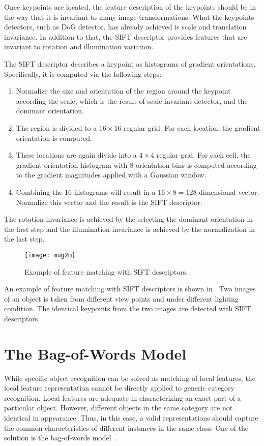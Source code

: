 \documentclass[12pt,final,twoside]{report}
\begin{document}
Once keypoints are located, the feature description of the keypoints should be in the way that it is invariant to many image transformations. What the keypoints detectors, such as DoG detector, has already achieved is scale and translation invariance. In addition to that, the SIFT descriptor provides features that are invariant to rotation and illumination variation.

The SIFT descriptor describes a keypoint as histograms of gradient orientations. Specifically, it is computed via the following steps:
\begin{enumerate}
  \item Normalize the size and orientation of the region around the keypoint according the scale, which is the result of scale invariant detector, and the dominant orientation.
  \item The region is divided to a $16 \times 16$ regular grid. For each location, the gradient orientation is computed.
  \item These locations are again divide into a $4 \times 4$ regular grid. For each cell, the gradient orientation histogram with 8 orientation bins is computed according to the gradient magnitudes applied with a Gaussian window.
  \item Combining the $16$ histograms will result in a $16 \times 8 = 128$ dimensional vector. Normalize this vector and the result is the SIFT descriptor.
\end{enumerate}

The rotation invariance is achieved by the selecting the dominant orientation in the first step and the illumination invariance is achieved by the normalization in the last step.

\begin{figure}[t]
  \centering
  \texttt{[image: mug2m]}
  \caption{Example of feature matching with SIFT descriptors.}
  \label{fig:match}
\end{figure}

An example of feature matching with SIFT descriptors is shown in . Two images of an object is taken from different view points and under different lighting condition. The identical keypoints from the two images are detected with SIFT descriptors.

\section{The Bag-of-Words Model}
While specific object recognition can be solved as matching of local features, the local feature representation cannot be directly applied to generic category recognition. Local features are adequate in characterizing an exact part of a particular object. However, different objects in the same category are not identical in appearance. Thus, in this case, a valid representations should capture the common characteristics of different instances in the same class. One of the solution is the bag-of-words model~\cite{csurka_visual_2004}.
\end{document}
